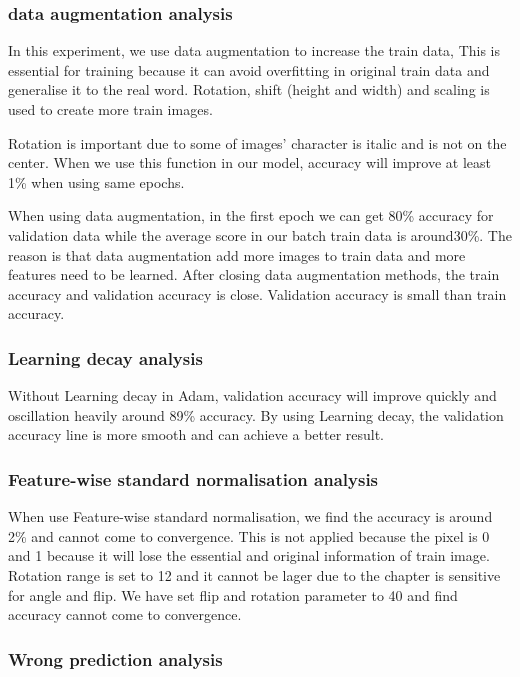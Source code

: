\documentclass[twoside,twocolumn,10.8pt]{article}
\begin{document}
\subsubsection{data augmentation analysis}

In this experiment, we use data augmentation to increase the train data, This is essential for training because it can avoid overfitting in original train data and generalise it to the real word. Rotation, shift (height and width) and scaling is used to create more train images. 


\noindent Rotation is important due to some of images’ character is italic and is not on the center. When we use this function in our model, accuracy will improve at least 1\% when using same epochs. 


\noindent When using data augmentation, in the first epoch we can get 80\% accuracy for validation data while the average score in our batch train data is around30\%. The reason is that data augmentation add more images to train data and more features need to be learned. After closing data augmentation  methods, the train accuracy and validation accuracy is close. Validation accuracy is small than train accuracy. 


\subsubsection{Learning decay analysis}
Without Learning decay in Adam, validation accuracy will improve quickly and oscillation heavily around 89\% accuracy. By using Learning decay, the validation accuracy line is more smooth and can achieve a better result.

\subsubsection{Feature-wise standard normalisation analysis}
When use Feature-wise standard normalisation, we find the accuracy is around 2\% and cannot come to convergence. This is not applied because the pixel is 0 and 1 because it will lose the essential and original information of train image. Rotation range is set to 12 and it cannot be lager due to the chapter is sensitive for angle and flip. We have set flip and rotation parameter to 40 and find accuracy cannot come to convergence. 

\subsubsection{Wrong prediction analysis}
\end{document}
